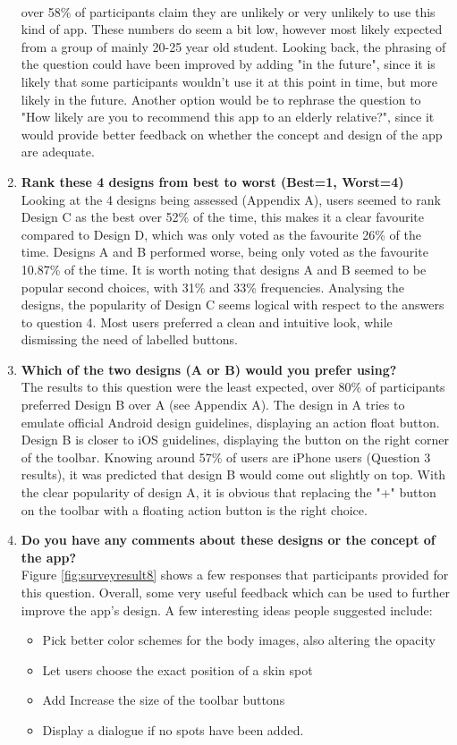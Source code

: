 \begin{enumerate}
    \\ over 58\% of participants claim they are unlikely or very unlikely to use this kind of app. These numbers do seem a bit low, however most likely expected from a group of mainly 20-25 year old student. Looking back, the phrasing of the question could have been improved by adding "in the future", since it is likely that some participants wouldn't use it at this point in time, but more likely in the future. Another option would be to rephrase the question to "How likely are you to recommend this app to an elderly relative?", since it would provide better feedback on whether the concept and design of the app are adequate. 
    \item \textbf{Rank these 4 designs from best to worst (Best=1, Worst=4)}
    \\ Looking at the 4 designs being assessed (Appendix A), users seemed to rank Design C as the best over 52\% of the time, this makes it a clear favourite compared to Design D, which was only voted as the favourite 26\% of the time. Designs A and B performed worse, being only voted as the favourite 10.87\% of the time. It is worth noting that designs A and B seemed to be popular second choices, with 31\% and 33\% frequencies. Analysing the designs, the popularity of Design C seems logical with respect to the answers to question 4. Most users preferred a clean and intuitive look, while dismissing the need of labelled buttons.
    \item \textbf{Which of the two designs (A or B) would you prefer using?}
    \\ The results to this question were the least expected, over 80\% of participants preferred Design B over A (see Appendix A). The design in A tries to emulate official Android design guidelines, displaying an action float button. Design B is closer to iOS guidelines, displaying the button on the right corner of the toolbar. Knowing around 57\% of users are iPhone users (Question 3 results), it was predicted that design B would come out slightly on top. With the clear popularity of design A, it is obvious that replacing the "+" button on the toolbar with a floating action button is the right choice.
    \item \textbf{Do you have any comments about these designs or the concept of the app?}
    \\ Figure \ref{fig:surveyresult8} shows a few responses that participants provided for this question. Overall, some very useful feedback which can be used to further improve the app's design. A few interesting ideas people suggested include:
    \begin{itemize}
        \item Pick better color schemes for the body images, also altering the opacity
        \item Let users choose the exact position of a skin spot
        \item Add Increase the size of the toolbar buttons
        \item Display a dialogue if no spots have been added.
    \end{itemize}
\end{enumerate}
